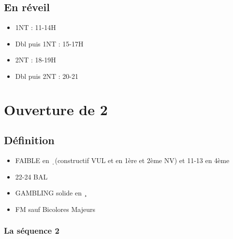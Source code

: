 \documentclass[a4paper]{article}
\begin{document}
\subsection{En réveil}

\begin{itemize}
\item 1NT : 11-14H

\item Dbl puis 1NT : 15-17H

\item 2NT : 18-19H

\item Dbl puis 2NT : 20-21

\end{itemize}

\section{Ouverture de 2\pdfc}

\subsection{Définition}

\begin{itemize}
\item FAIBLE en \d\ (constructif VUL et en 1ère et 2ème NV) et 11-13 en 4ème

\item 22-24 BAL

\item GAMBLING solide en \c\ 

\item FM sauf Bicolores Majeurs

\end{itemize}

\subsubsection{La séquence 2\pdfd}
\end{document}
